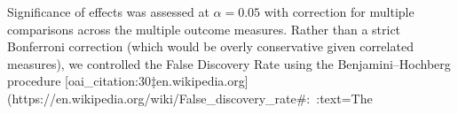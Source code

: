 Significance of effects was assessed at $\alpha=0.05$ with correction for multiple comparisons across the multiple outcome measures. Rather than a strict Bonferroni correction (which would be overly conservative given correlated measures), we controlled the False Discovery Rate using the Benjamini–Hochberg procedure [oai_citation:30‡en.wikipedia.org](https://en.wikipedia.org/wiki/False_discovery_rate#:~:text=The%

